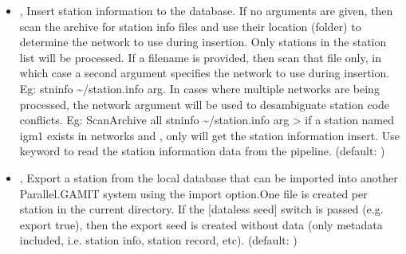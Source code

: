 \documentclass[letterpaper,10pt,english]{sphinxmanual}
\begin{document}
\begin{itemize}
\item {} 
\sphinxAtStartPar
{\hyperref[\detokenize{com:ScanArchive.py--stninfo}]{}} , {\hyperref[\detokenize{com:ScanArchive.py---station_info}]{}}  \sphinxhyphen{} Insert station information to the database. If no arguments are given, then scan the archive for station info files and use their location (folder) to determine the network to use during insertion. Only stations in the station list will be processed. If a filename is provided, then scan that file only, in which case a second argument specifies the network to use during insertion. Eg: \sphinxhyphen{}stninfo \textasciitilde{}/station.info arg. In cases where multiple networks are being processed, the network argument will be used to desambiguate station code conflicts. Eg: ScanArchive all \sphinxhyphen{}stninfo \textasciitilde{}/station.info arg \sphinxhyphen{}\textgreater{} if a station named igm1 exists in networks  and , only  will get the station information insert. Use keyword  to read the station information data from the pipeline. (default: )

\item {} 
\sphinxAtStartPar
{\hyperref[\detokenize{com:ScanArchive.py--export}]{}} , {\hyperref[\detokenize{com:ScanArchive.py---export_station}]{}}  \sphinxhyphen{} Export a station from the local database that can be imported into another Parallel.GAMIT system using the \sphinxhyphen{}import option.One file is created per station in the current directory. If the {[}dataless seed{]} switch is passed (e.g. \sphinxhyphen{}export true), then the export seed is created without data (only metadata included, i.e. station info, station record, etc). (default: )


\end{itemize}
\end{document}
